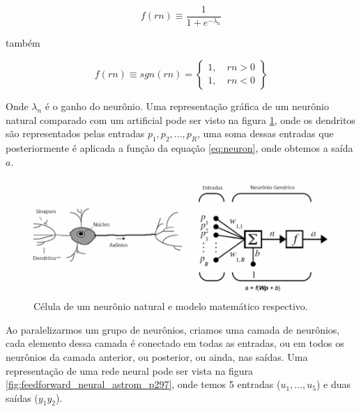 \begin{equation} \label{eq:neuron}
f(rn) \equiv \frac{1}{1+e^{-\lambda_n}}
\end{equation}

também

\begin{equation}
f(rn) \equiv sgn(rn) = \begin{Bmatrix}  1, \quad rn>0 \\ 1, \quad rn<0  \end{Bmatrix}
\end{equation}

Onde $\lambda_n$ é o ganho do neurônio. Uma representação gráfica de um neurônio natural comparado com um artificial pode ser visto na figura \ref{fig:neuronio_unal_p6}, onde os dendritos são representados pelas entradas $p_1, p_2, ..., p_R$, uma soma dessas entradas que posteriormente é aplicada a função da equação \ref{eq:neuron}, onde obtemos a saída $a$.

\begin{figure}[H]
  \caption{Célula de um neurônio natural e modelo matemático respectivo.}
    \begin{center}
        \includegraphics[scale=0.45]{referencial/img/neuronio_unal_p6}
  \end{center}
  \label{fig:neuronio_unal_p6}
\end{figure}

Ao paralelizarmos um grupo de neurônios, criamos uma camada de neurônios, cada elemento dessa camada é conectado em todas as entradas, ou em todos os neurônios da camada anterior, ou posterior, ou ainda, nas saídas. Uma representação de uma rede neural pode ser vista na figura \ref{fig:feedforward_neural_astrom_p297}, onde temos 5 entradas ($u_1,...,u_5$) e duas saídas ($y_1 y_2$).

